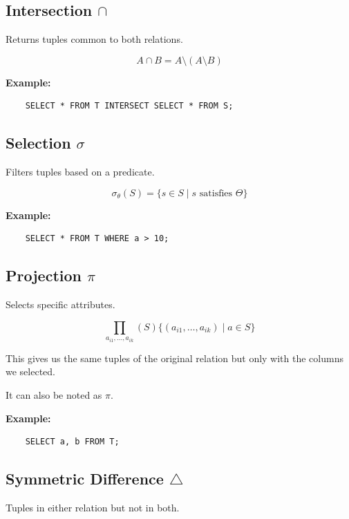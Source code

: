 \subsection{Intersection \texorpdfstring{\(\cap\)}{}}

Returns tuples common to both relations.

\[
    A \cap B = A \setminus (A \setminus B)
\]

\textbf{Example:}

\begin{verbatim}
    SELECT * FROM T INTERSECT SELECT * FROM S;
\end{verbatim}

\subsection{Selection \texorpdfstring{\(\sigma\)}{}}

Filters tuples based on a predicate.

\[
    \sigma_{\theta}(S) = \{s \in S \mid s \text{ satisfies } \Theta\}
\]

\textbf{Example:}

\begin{verbatim}
    SELECT * FROM T WHERE a > 10;
\end{verbatim}

\subsection{Projection \texorpdfstring{\(\pi\)}{}}

Selects specific attributes.

\[
    \prod_{a_{i1}, \dots, a_{ik}}(S) \{(a_{i1}, \dots, a_{ik}) \mid a \in S\}
\]

This gives us the same tuples of the original relation but only with the columns we selected. 

It can also be noted as \(\pi\).

\textbf{Example:}

\begin{verbatim}
    SELECT a, b FROM T;
\end{verbatim}

\subsection{Symmetric Difference \texorpdfstring{\(\triangle\)}{}}

Tuples in either relation but not in both.

